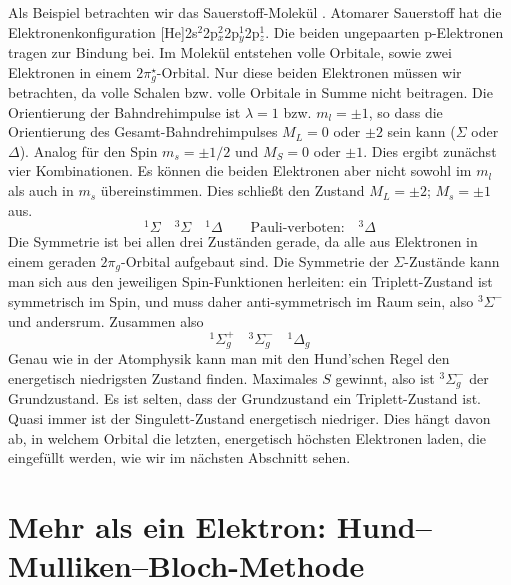 Als Beispiel betrachten wir das Sauerstoff-Molekül . Atomarer Sauerstoff hat die Elektronenkonfiguration [He]2s$^2$2p$_x^2$2p$_y^1$2p$_z^1$. Die beiden ungepaarten p-Elektronen tragen zur Bindung bei. Im Molekül entstehen volle Orbitale, sowie zwei Elektronen in einem $2\pi_g^\star$-Orbital. Nur diese beiden Elektronen müssen wir betrachten, da volle Schalen bzw. volle Orbitale in Summe nicht beitragen. Die Orientierung der  Bahndrehimpulse ist  $\lambda = 1$ bzw. $m_l = \pm 1$, so dass die Orientierung des Gesamt-Bahndrehimpulses $M_L = 0$ oder $\pm 2$ sein kann ($\Sigma$ oder $\Delta$). Analog für den Spin $m_s = \pm 1/2$ und $M_S = 0 $ oder $\pm 1$. Dies ergibt zunächst  vier  Kombinationen. Es können die beiden Elektronen aber nicht sowohl im $m_l$ als auch in $m_s$ übereinstimmen. Dies schließt den Zustand $M_L = \pm 2$; $M_s = \pm 1$ aus.
\begin{equation}
 ^1\Sigma \quad ^3\Sigma \quad ^1\Delta \qquad \text{Pauli-verboten:} \quad ^3\Delta  
\end{equation}
Die Symmetrie ist bei allen drei Zuständen gerade, da alle aus  Elektronen in einem geraden $2\pi_g$-Orbital aufgebaut sind. Die Symmetrie der $\Sigma$-Zustände kann man sich aus den jeweiligen Spin-Funktionen herleiten: ein Triplett-Zustand ist symmetrisch im Spin, und muss daher anti-symmetrisch im Raum sein, also $^3\Sigma^-$ und andersrum. Zusammen also
\begin{equation}
 ^1\Sigma_g^+ \quad ^3\Sigma_g^- \quad ^1\Delta _g
\end{equation}
Genau wie in der Atomphysik kann man mit den Hund'schen Regel den energetisch niedrigsten Zustand finden. Maximales $S$ gewinnt, also ist $^3\Sigma_g^- $ der Grundzustand. Es ist selten, dass der Grundzustand ein Triplett-Zustand ist. Quasi immer ist der Singulett-Zustand energetisch niedriger. Dies hängt davon ab, in welchem Orbital die letzten, energetisch höchsten Elektronen laden, die eingefüllt werden, wie wir im nächsten Abschnitt sehen.





\section{Mehr als ein Elektron: Hund--Mulliken--Bloch-Methode }

